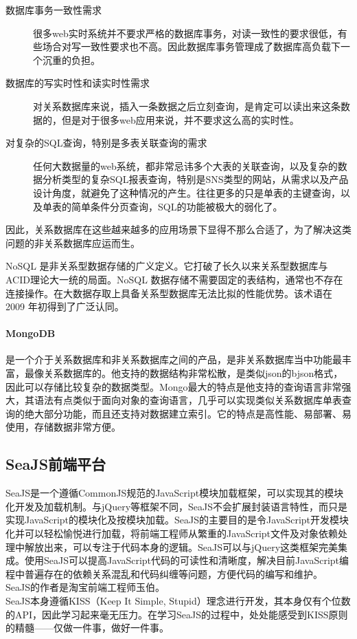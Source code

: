 \begin{description}
    \item[数据库事务一致性需求] 很多web实时系统并不要求严格的数据库事务，对读一致性的要求很低，有些场合对写一致性要求也不高。因此数据库事务管理成了数据库高负载下一个沉重的负担。
    \item[数据库的写实时性和读实时性需求] 对关系数据库来说，插入一条数据之后立刻查询，是肯定可以读出来这条数据的，但是对于很多web应用来说，并不要求这么高的实时性。
    \item[对复杂的SQL查询，特别是多表关联查询的需求] 任何大数据量的web系统，都非常忌讳多个大表的关联查询，以及复杂的数据分析类型的复杂SQL报表查询，特别是SNS类型的网站，从需求以及产品设计角度，就避免了这种情况的产生。往往更多的只是单表的主键查询，以及单表的简单条件分页查询，SQL的功能被极大的弱化了。
\end{description}

\noindent
因此，关系数据库在这些越来越多的应用场景下显得不那么合适了，为了解决这类问题的非关系数据库应运而生。

NoSQL 是非关系型数据存储的广义定义。它打破了长久以来关系型数据库与ACID理论大一统的局面。NoSQL 数据存储不需要固定的表结构，通常也不存在连接操作。在大数据存取上具备关系型数据库无法比拟的性能优势。该术语在 2009 年初得到了广泛认同。

\paragraph{MongoDB}
是一个介于关系数据库和非关系数据库之间的产品，是非关系数据库当中功能最丰富，最像关系数据库的。他支持的数据结构非常松散，是类似json的bjson格式，因此可以存储比较复杂的数据类型。Mongo最大的特点是他支持的查询语言非常强大，其语法有点类似于面向对象的查询语言，几乎可以实现类似关系数据库单表查询的绝大部分功能，而且还支持对数据建立索引。它的特点是高性能、易部署、易使用，存储数据非常方便。


\subsection{SeaJS前端平台}
\indent
SeaJS是一个遵循CommonJS规范的JavaScript模块加载框架，可以实现其的模块化开发及加载机制。与jQuery等框架不同，SeaJS不会扩展封装语言特性，而只是实现JavaScript的模块化及按模块加载。SeaJS的主要目的是令JavaScript开发模块化并可以轻松愉悦进行加载，将前端工程师从繁重的JavaScript文件及对象依赖处理中解放出来，可以专注于代码本身的逻辑。SeaJS可以与jQuery这类框架完美集成。使用SeaJS可以提高JavaScript代码的可读性和清晰度，解决目前JavaScript编程中普遍存在的依赖关系混乱和代码纠缠等问题，方便代码的编写和维护。\\[0.1cm]
\indent
SeaJS的作者是淘宝前端工程师玉伯。\\
\indent
SeaJS本身遵循KISS（Keep It Simple, Stupid）理念进行开发，其本身仅有个位数的API，因此学习起来毫无压力。在学习SeaJS的过程中，处处能感受到KISS原则的精髓——仅做一件事，做好一件事。